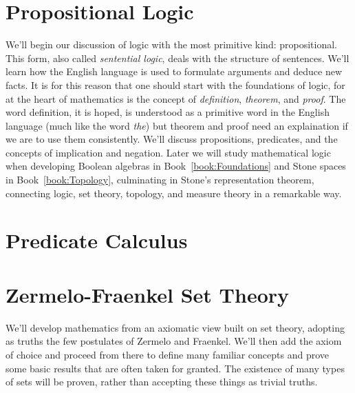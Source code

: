 \begingroup
    \ifcsname\PATH\endcsname
        \newcommand{\PATH}{books/Foundations/Logic_and_Sets}
        \newcommand{\OLDPATH}{\PATH}
    \else
        \newcommand{\OLDPATH}{\PATH}
        \renewcommand{\PATH}{books/Foundations/Logic_and_Sets}
    \fi
    \chapter{Propositional Logic}
        \label{chapt:Propositional_Logic}%
        We'll begin our discussion of logic with the most primitive kind:
        propositional. This form, also called
        \textit{sentential logic}, deals with the
        structure of sentences. We'll learn how the English language is used to
        formulate arguments and deduce new facts. It is for this reason that one
        should start with the foundations of logic, for at the heart of
        mathematics is the concept of \textit{definition}, \textit{theorem}, and
        \textit{proof}. The word definition, it is hoped, is understood as a
        primitive word in the English language (much like the word \textit{the})
        but theorem and proof need an explaination if we are to use them
        consistently. We'll discuss propositions, predicates, and the concepts
        of implication and negation. Later we will study mathematical logic when
        developing Boolean algebras in
        Book~\ref{book:Foundations} and Stone spaces in
        Book~\ref{book:Topology}, culminating in Stone's representation
        theorem, connecting logic, set
        theory, topology, and measure theory in a remarkable way.
        
        
    \chapter{Predicate Calculus}
        \label{chapt:Predicate_Calculus}%
        
    \chapter{Zermelo-Fraenkel Set Theory}
        \label{chapt:Zermelo_Fraenkel_Set_Theory}%
        We'll develop mathematics from an axiomatic view built on set theory,
        adopting as truths the few postulates of Zermelo and Fraenkel. We'll
        then add the axiom of choice and proceed from there to define many
        familiar concepts and prove some basic results that are often taken for
        granted. The existence of many types of sets will be proven, rather than
        accepting these things as trivial truths.
        
        
        
